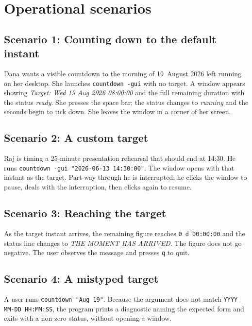 \documentclass[12pt]{article}
\newcommand{\code}[1]{\texttt{#1}}
\begin{document}
\section{Operational scenarios}

\subsection{Scenario 1: Counting down to the default instant}

Dana wants a visible countdown to the morning of 19~August 2026 left
running on her desktop.  She launches \code{countdown -gui} with no target.
A window appears showing \emph{Target: Wed 19 Aug 2026 08:00:00} and the
full remaining duration with the status \emph{ready}.  She presses the
space bar; the status changes to \emph{running} and the seconds begin to
tick down.  She leaves the window in a corner of her screen.

\subsection{Scenario 2: A custom target}

Raj is timing a 25-minute presentation rehearsal that should end at
14:30.  He runs \code{countdown -gui "2026-06-13 14:30:00"}.  The window
opens with that instant as the target.  Part-way through he is
interrupted; he clicks the window to pause, deals with the interruption,
then clicks again to resume.

\subsection{Scenario 3: Reaching the target}

As the target instant arrives, the remaining figure reaches
\code{0 d 00:00:00} and the status line changes to \emph{THE MOMENT HAS
ARRIVED}.  The figure does not go negative.  The user observes the message
and presses \code{q} to quit.

\subsection{Scenario 4: A mistyped target}

A user runs \code{countdown "Aug 19"}.  Because the argument does not match
\code{YYYY-MM-DD HH:MM:SS}, the program prints a diagnostic naming the
expected form and exits with a non-zero status, without opening a window.
\end{document}
